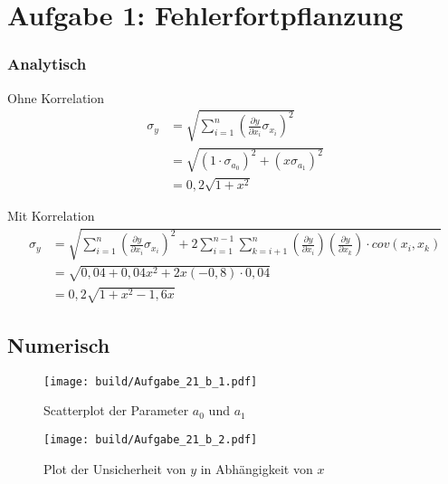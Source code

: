 \section*{Aufgabe 1: Fehlerfortpflanzung}
\label{sec:Aufgabe1}
\subsubsection*{Analytisch}
\label{ssub:Analytisch}
Ohne Korrelation
\begin{align}
    \sigma_y&=\sqrt{\sum_{i=1}^n\left(\frac{\partial y}{\partial x_i}\sigma_{x_i}\right)^2}\nonumber\\
            &=\sqrt{\left(1\cdot\sigma_{a_0}\right)^2+\left(x\sigma_{a_1}\right)^2}\nonumber\\
            &=0,2\sqrt{1+x^2}
\end{align}

Mit Korrelation
\begin{align}
    \sigma_y&=\sqrt{\sum_{i=1}^n\left(\frac{\partial y}{\partial x_i}\sigma_{x_i}\right)^2+2\sum_{i=1}^{n-1}\sum_{k=i+1}^{n}\left(\frac{\partial y}{\partial x_i}\right)\left(\frac{\partial y}{\partial x_k}\right)\cdot cov(x_i,x_k)}\nonumber\\
            &=\sqrt{0,04+0,04x^2+2 x (-0,8)\cdot 0,04}\nonumber\\
            &=0,2\sqrt{1+x^2-1,6x}
\end{align}

\subsection{Numerisch}
\label{sub:Numerisch}
\begin{figure}
    \centering
    \texttt{[image: build/Aufgabe\_21\_b\_1.pdf]}
    \caption{Scatterplot der Parameter $a_0$ und $a_1$}
    \label{fig:A_1_b_1}
\end{figure}
\begin{figure}
    \centering
    \texttt{[image: build/Aufgabe\_21\_b\_2.pdf]}
    \caption{Plot der Unsicherheit von $y$ in Abhängigkeit von $x$}
    \label{fig:A_1_b_2}
\end{figure}